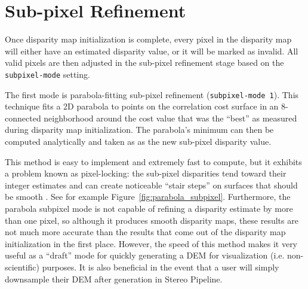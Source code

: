 \section{Sub-pixel Refinement}
\label{sec:subpixel}

Once disparity map initialization is complete, every pixel in the
disparity map will either have an estimated disparity value, or it
will be marked as invalid.  All valid pixels are then adjusted in the
sub-pixel refinement stage based on the \texttt{subpixel-mode}
setting. %

The first mode is parabola-fitting sub-pixel refinement
(\texttt{subpixel-mode 1}).  This technique fits a 2D parabola to
points on the correlation cost surface in an 8-connected neighborhood
around the cost value that was the ``best'' as measured during
disparity map initialization. The parabola's minimum can then be
computed analytically and taken as as the new sub-pixel disparity
value.

This method is easy to implement and extremely fast to compute, but it
exhibits a problem known as pixel-locking: the sub-pixel disparities
tend toward their integer estimates and can create noticeable ``stair
steps'' on surfaces that should be smooth
\citep{Stein06:attenuating,Szeliski03sampling}.  See
for example Figure~\ref{fig:parabola_subpixel}. Furthermore, the parabola
subpixel mode is not capable of refining a disparity estimate by more
than one pixel, so although it produces smooth disparity maps, these
results are not much more accurate than the results that come out of
the disparity map initialization in the first place.  However, the
speed of this method makes it very useful as a ``draft'' mode for
quickly generating a \ac{DEM} for visualization (i.e. non-scientific)
purposes. It is also beneficial in the event that a user will simply
downsample their DEM after generation in Stereo Pipeline.

